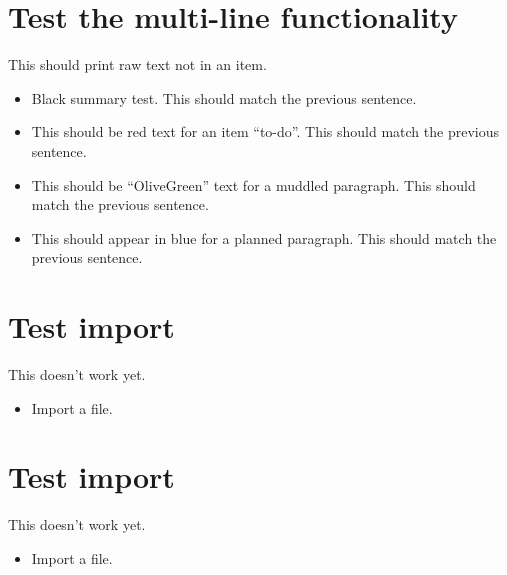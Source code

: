 \chapter{Test the multi-line functionality}
\label{autosec:7}
This should print raw text not in an item.
    \begin{itemize}[noitemsep]
        \item Black summary test.
This should match the previous sentence.
        \item {\color{red}This should be red text for an item ``to-do''.}
{\color{red}This should match the previous sentence.}
        \item {\color{OliveGreen}This should be ``OliveGreen'' text for a muddled paragraph.}
{\color{OliveGreen}This should match the previous sentence.}
        \item {\color{blue}This should appear in blue for a planned paragraph.}
{\color{blue}This should match the previous sentence.}
    \end{itemize}
\chapter{Test import}
\label{autosec:8}
This doesn't work yet.
    \begin{itemize}[noitemsep]
        \item {\color{red}Import a file.}
    \end{itemize}
\chapter{Test import}
\label{autosec:9}
This doesn't work yet.
    \begin{itemize}[noitemsep]
        \item {\color{red}Import a file.}
    \end{itemize}

